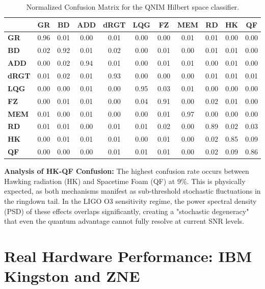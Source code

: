 \documentclass[11pt,a4paper,spanish]{book}
\numberwithin{equation}{chapter}
\numberwithin{figure}{chapter}
\numberwithin{equation}{chapter}
\numberwithin{figure}{chapter}
\numberwithin{table}{chapter}
\begin{document}
\begin{table}[ht]
\centering
\scriptsize
\caption{Normalized Confusion Matrix for the QNIM Hilbert space classifier.}
\label{tab:confusion}
\begin{tabular}{lcccccccccc}
\toprule
& \textbf{GR} & \textbf{BD} & \textbf{ADD} & \textbf{dRGT} & \textbf{LQG} & \textbf{FZ} & \textbf{MEM} & \textbf{RD} & \textbf{HK} & \textbf{QF} \\ \midrule
\textbf{GR} & 0.96 & 0.01 & 0.00 & 0.01 & 0.00 & 0.00 & 0.01 & 0.01 & 0.00 & 0.00 \\
\textbf{BD} & 0.02 & 0.92 & 0.01 & 0.02 & 0.00 & 0.01 & 0.00 & 0.01 & 0.01 & 0.00 \\
\textbf{ADD} & 0.00 & 0.02 & 0.94 & 0.01 & 0.00 & 0.01 & 0.01 & 0.00 & 0.01 & 0.00 \\
\textbf{dRGT} & 0.01 & 0.02 & 0.01 & 0.93 & 0.00 & 0.00 & 0.00 & 0.01 & 0.01 & 0.01 \\
\textbf{LQG} & 0.00 & 0.00 & 0.01 & 0.00 & 0.95 & 0.03 & 0.01 & 0.00 & 0.00 & 0.00 \\
\textbf{FZ} & 0.00 & 0.01 & 0.01 & 0.00 & 0.04 & 0.91 & 0.00 & 0.02 & 0.01 & 0.00 \\
\textbf{MEM} & 0.01 & 0.00 & 0.01 & 0.00 & 0.00 & 0.01 & 0.97 & 0.00 & 0.00 & 0.00 \\
\textbf{RD} & 0.01 & 0.01 & 0.00 & 0.01 & 0.01 & 0.02 & 0.00 & 0.89 & 0.02 & 0.03 \\
\textbf{HK} & 0.00 & 0.01 & 0.01 & 0.01 & 0.00 & 0.01 & 0.00 & 0.02 & 0.85 & 0.09 \\
\textbf{QF} & 0.00 & 0.00 & 0.00 & 0.01 & 0.01 & 0.01 & 0.00 & 0.02 & 0.09 & 0.86 \\ \bottomrule
\end{tabular}
\end{table}

\textbf{Analysis of HK-QF Confusion:} The highest confusion rate occurs between Hawking radiation (HK) and Spacetime Foam (QF) at 9\%. This is physically expected, as both mechanisms manifest as sub-threshold stochastic fluctuations in the ringdown tail. In the LIGO O3 sensitivity regime, the power spectral density (PSD) of these effects overlaps significantly, creating a "stochastic degeneracy" that even the quantum advantage cannot fully resolve at current SNR levels.

\section{Real Hardware Performance: IBM Kingston and ZNE}
\end{document}
